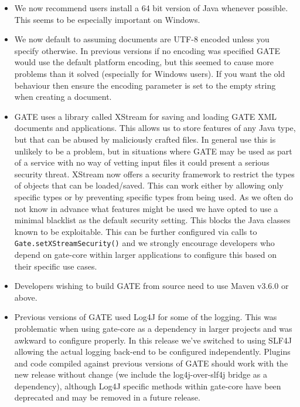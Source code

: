 \begin{itemize}
\item We now recommend users install a 64 bit version of Java whenever possible. This
      seems to be especially important on Windows.
\item We now default to assuming documents are UTF-8 encoded unless you specify otherwise.
      In previous versions if no encoding was specified GATE would use the default platform
      encoding, but this seemed to cause more problems than it solved (especially for Windows
      users). If you want the old behaviour then ensure the encoding parameter is set to the
      empty string when creating a document.
\item GATE uses a library called XStream for saving and loading GATE XML documents and
      applications. This allows us to store features of any Java type, but that can be
      abused by maliciously crafted files. In general use this is unlikely to be a problem,
      but in situations where GATE may be used as part of a service with no way of vetting
      input files it could present a serious security threat. XStream now offers a security
      framework to restrict the types of objects that can be loaded/saved. This can work either
      by allowing only specific types or by preventing specific types from being used. As we
      often do not know in advance what features might be used we have opted to use a minimal
      blacklist as the default security setting. This blocks the Java classes known to be
      exploitable. This can be further configured via calls to \verb!Gate.setXStreamSecurity()!
      and we strongly encourage developers who depend on gate-core within larger applications
      to configure this based on their specific use cases.
\item Developers wishing to build GATE from source need to use Maven v3.6.0 or above.
\item Previous versions of GATE used Log4J for some of the logging. This was problematic
      when using gate-core as a dependency in larger projects and was awkward to configure
      properly. In this release we've switched to using SLF4J allowing the actual logging
      back-end to be configured independently. Plugins and code compiled against previous
      versions of GATE should work with the new release without change (we include the
      log4j-over-slf4j bridge as a dependency), although Log4J specific methods within
      gate-core have been deprecated and may be removed in a future release.
\end{itemize}

